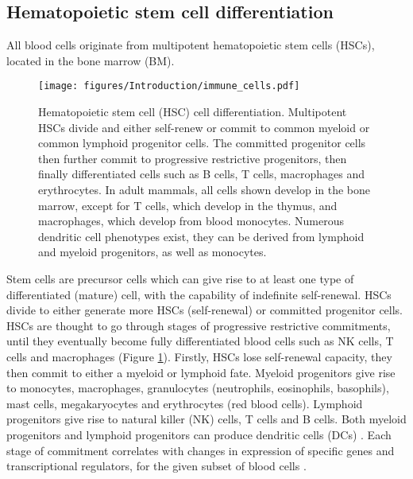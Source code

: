 \subsection{Hematopoietic stem cell differentiation}
All blood cells originate from multipotent hematopoietic stem cells (HSCs), located in the bone marrow (BM).
%
\begin{figure}[htb]
\centering\texttt{[image: figures/Introduction/immune\_cells.pdf]}
\caption[Hematopoietic system cell differentiation]{Hematopoietic stem cell (HSC) cell differentiation.
Multipotent HSCs divide and either self-renew or commit to common myeloid or common lymphoid progenitor cells.
The committed progenitor cells then further commit to progressive restrictive progenitors, then finally differentiated cells such as B cells, T cells, macrophages and erythrocytes.
In adult mammals, all cells shown develop in the bone marrow, except for T cells, which develop in the thymus, and macrophages, which develop from blood monocytes.
Numerous dendritic cell phenotypes exist, they can be derived from lymphoid and myeloid progenitors, as well as monocytes.}
\label{fig:HSC_differentiation}\end{figure}
Stem cells are precursor cells which can give rise to at least one type of differentiated (mature) cell, with the capability of indefinite self-renewal.
HSCs divide to either generate more HSCs (self-renewal) or committed progenitor cells.
HSCs are thought to go through stages of progressive restrictive commitments, until they eventually become fully differentiated blood cells such as NK cells, T cells and macrophages (Figure \ref{fig:HSC_differentiation}).
Firstly, HSCs lose self-renewal capacity, they then commit to either a myeloid or lymphoid fate.
Myeloid progenitors give rise to monocytes, macrophages, granulocytes (neutrophils, eosinophils, basophils), mast cells, megakaryocytes and erythrocytes (red blood cells).
Lymphoid progenitors give rise to natural killer (NK) cells, T cells and B cells.
Both myeloid progenitors and lymphoid progenitors can produce dendritic cells (DCs) \cite{alberts2007molecularstem}.
Each stage of commitment correlates with changes in expression of specific genes and transcriptional regulators, for the given subset of blood cells \cite{seita2010hematopoietic}.

